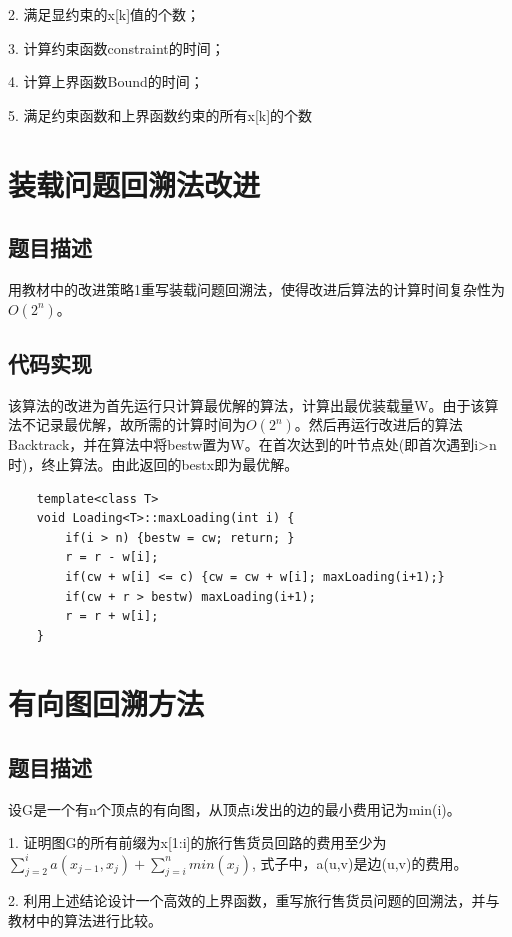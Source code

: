 \documentclass[UTF8]{ctexart}
\begin{document}
    2. 满足显约束的x[k]值的个数；

    3. 计算约束函数constraint的时间；

    4. 计算上界函数Bound的时间；

    5. 满足约束函数和上界函数约束的所有x[k]的个数

    \section{装载问题回溯法改进}
    \subsection{题目描述}
    用教材中的改进策略1重写装载问题回溯法，使得改进后算法的计算时间复杂性为$O(2^n)$。

    \subsection{代码实现}
    该算法的改进为首先运行只计算最优解的算法，计算出最优装载量W。由于该算法不记录最优解，故所需的计算时间为$O(2^n)$。然后再运行改进后的算法Backtrack，并在算法中将bestw置为W。在首次达到的叶节点处(即首次遇到i>n时)，终止算法。由此返回的bestx即为最优解。

    \begin{small}
    \begin{lstlisting}
    template<class T>
    void Loading<T>::maxLoading(int i) {
        if(i > n) {bestw = cw; return; }
        r = r - w[i];
        if(cw + w[i] <= c) {cw = cw + w[i]; maxLoading(i+1);}
        if(cw + r > bestw) maxLoading(i+1);
        r = r + w[i];
    }
    \end{lstlisting}
    \end{small}

    \section{有向图回溯方法}
    \subsection{题目描述}
    设G是一个有n个顶点的有向图，从顶点i发出的边的最小费用记为min(i)。

    1. 证明图G的所有前缀为x[1:i]的旅行售货员回路的费用至少为$\sum_{j=2}^{i}a(x_{j-1}, x_{j}) + \sum_{j=i}^{n} min(x_j)$, 式子中，a(u,v)是边(u,v)的费用。

    2. 利用上述结论设计一个高效的上界函数，重写旅行售货员问题的回溯法，并与教材中的算法进行比较。
    
\end{document}
